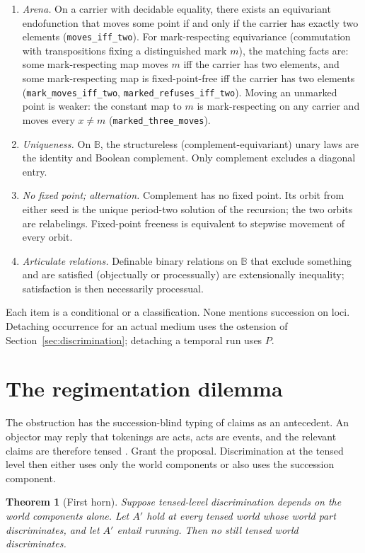 \documentclass[11pt]{article}
\newtheorem{theorem}{Theorem}[section]
\newcommand{\lf}[1]{\texttt{#1}}
\newcommand{\B}{\mathbb{B}}
\begin{document}
\begin{enumerate}[itemsep=2pt,leftmargin=*]
\item \emph{Arena.} On a carrier with decidable equality, there exists an
equivariant endofunction that moves some point if and only if the carrier has
exactly two elements (\lf{moves\_iff\_two}). For mark-respecting equivariance
(commutation with transpositions fixing a distinguished mark \(m\)), the
matching facts are: some mark-respecting map moves \(m\) iff the carrier has
two elements, and some mark-respecting map is fixed-point-free iff the carrier
has two elements (\lf{mark\_moves\_iff\_two}, \lf{marked\_refuses\_iff\_two}).
Moving an unmarked point is weaker: the constant map to \(m\) is
mark-respecting on any carrier and moves every \(x\neq m\)
(\lf{marked\_three\_moves}).
\item \emph{Uniqueness.} On \(\B\), the structureless (complement-equivariant)
unary laws are the identity and Boolean complement. Only complement excludes a
diagonal entry.
\item \emph{No fixed point; alternation.} Complement has no fixed point. Its
orbit from either seed is the unique period-two solution of the recursion; the
two orbits are relabelings. Fixed-point freeness is equivalent to stepwise
movement of every orbit.
\item \emph{Articulate relations.} Definable binary relations on \(\B\) that
exclude something and are satisfied (objectually or processually) are
extensionally inequality; satisfaction is then necessarily processual.
\end{enumerate}

Each item is a conditional or a classification. None mentions succession on
loci. Detaching occurrence for an actual medium uses the ostension of
Section~\ref{sec:discrimination}; detaching a temporal run uses \(P\).

\section{The regimentation dilemma}
\label{sec:dilemma}

The obstruction has the succession-blind typing of claims as an antecedent. An
objector may reply that tokenings are acts, acts are events, and the relevant
claims are therefore tensed \cite{apel1980,hintikka1962}. Grant the proposal.
Discrimination at the tensed level then either uses only the world components
or also uses the succession component.

\begin{theorem}[First horn]
\label{thm:hornone}
Suppose tensed-level discrimination depends on the world components alone. Let
\(A'\) hold at every tensed world whose world part discriminates, and let
\(A'\) entail running. Then no still tensed world discriminates.
\end{theorem}
\end{document}
